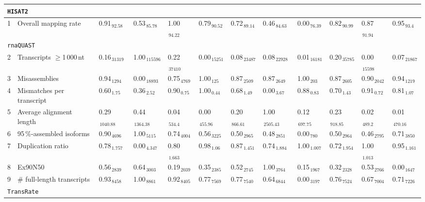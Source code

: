 \documentclass{scrartcl}
\begin{document}
\begin{landscape}
\begin{table}
\begin{scriptsize}
\begin{tabular}{llllllllllll}
\multicolumn{11}{l}{\texttt{HISAT2}}\\ 
\midrule
1 & Overall mapping rate  & 0.91$_{\,92.58}$ & 0.53$_{\,85.78}$ & 1.00$_{\,94.22}$ & 0.79$_{\,90.52}$ & 0.72$_{\,89.14}$ & 0.46$_{\,84.63}$ & 0.00$_{\,76.39}$ & 0.82$_{\,90.99}$ & 0.87$_{\,91.94}$ & 0.95$_{\,93.4}$ \\\midrule
\multicolumn{11}{l}{\texttt{rnaQUAST}}\\ 
\midrule
2 & Transcripts $\geq$1\,000\,nt  & 0.16$_{\,31319}$ & 1.00$_{\,115596}$ & 0.22$_{\,37410}$ & 0.00$_{\,15251}$ & 0.08$_{\,23487}$ & 0.08$_{\,22928}$ & 0.01$_{\,16181}$ & 0.20$_{\,35785}$ & 0.00$_{\,15598}$ & 0.07$_{\,21867}$ \\3 & Misassemblies  & 0.94$_{\,1294}$ & 0.00$_{\,18893}$ & 0.75$_{\,4769}$ & 1.00$_{\,125}$ & 0.87$_{\,2509}$ & 0.87$_{\,2649}$ & 1.00$_{\,203}$ & 0.87$_{\,2605}$ & 0.90$_{\,2042}$ & 0.94$_{\,1219}$ \\4 & Mismatches per transcript  & 0.60$_{\,1.75}$ & 0.36$_{\,2.52}$ & 0.90$_{\,0.75}$ & 1.00$_{\,0.44}$ & 0.68$_{\,1.49}$ & 0.00$_{\,3.67}$ & 0.88$_{\,0.83}$ & 0.70$_{\,1.43}$ & 0.91$_{\,0.72}$ & 0.81$_{\,1.07}$ \\5 & Average alignment length  & 0.29$_{\,1040.88}$ & 0.44$_{\,1364.38}$ & 0.04$_{\,534.4}$ & 0.00$_{\,455.96}$ & 0.20$_{\,866.61}$ & 1.00$_{\,2505.43}$ & 0.12$_{\,697.75}$ & 0.23$_{\,918.85}$ & 0.02$_{\,489.2}$ & 0.01$_{\,470.16}$ \\6 & 95\,\%-assembled isoforms  & 0.90$_{\,4696}$ & 1.00$_{\,5115}$ & 0.74$_{\,4004}$ & 0.56$_{\,3225}$ & 0.50$_{\,2965}$ & 0.48$_{\,2851}$ & 0.00$_{\,780}$ & 0.50$_{\,2964}$ & 0.46$_{\,2795}$ & 0.71$_{\,3850}$ \\7 & Duplication ratio  & 0.78$_{\,1.757}$ & 0.00$_{\,4.347}$ & 0.80$_{\,1.663}$ & 0.98$_{\,1.06}$ & 0.87$_{\,1.451}$ & 0.74$_{\,1.884}$ & 1.00$_{\,1.007}$ & 0.72$_{\,1.954}$ & 1.00$_{\,1.013}$ & 0.95$_{\,1.161}$ \\\midrule
8 & Ex90N50  & 0.56$_{\,2839}$ & 0.64$_{\,3003}$ & 0.19$_{\,2039}$ & 0.35$_{\,2385}$ & 0.52$_{\,2745}$ & 1.00$_{\,3764}$ & 0.15$_{\,1967}$ & 0.32$_{\,2328}$ & 0.53$_{\,2766}$ & 0.00$_{\,1647}$ \\9 & \# full-length transcripts  & 0.93$_{\,8458}$ & 1.00$_{\,8861}$ & 0.92$_{\,8405}$ & 0.77$_{\,7569}$ & 0.77$_{\,7540}$ & 0.64$_{\,6844}$ & 0.00$_{\,3197}$ & 0.76$_{\,7524}$ & 0.67$_{\,7004}$ & 0.71$_{\,7226}$ \\\midrule
\multicolumn{11}{l}{\texttt{TransRate}}\\ 
\midrule

\end{tabular}
\end{scriptsize}
\end{table}
\end{landscape}
\end{document}
